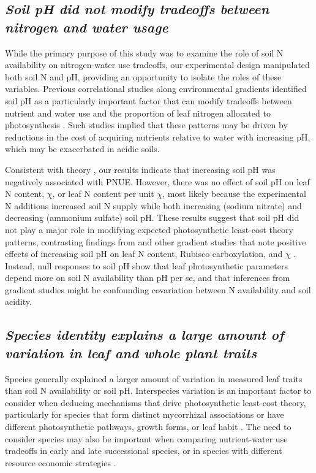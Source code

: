     \subsection{\textit{Soil pH did not modify tradeoffs between nitrogen and water usage}}
    While the primary purpose of this study was to examine the role of soil N availability on nitrogen-water use tradeoffs, our experimental design manipulated both soil N and pH, providing an opportunity to isolate the roles of these variables. Previous correlational studies along environmental gradients identified soil pH as a particularly important factor that can modify tradeoffs between nutrient and water use  and the proportion of leaf nitrogen allocated to photosynthesis . Such studies implied that these patterns may be driven by reductions in the cost of acquiring nutrients relative to water with increasing pH, which may be exacerbated in acidic soils.

    Consistent with theory , our results indicate that increasing soil pH was negatively associated with PNUE. However, there was no effect of soil pH on leaf N content, $\chi$, or leaf N content per unit $\chi$, most likely because the experimental N additions increased soil N supply while both increasing (sodium nitrate) and decreasing (ammonium sulfate) soil pH. These results suggest that soil pH did not play a major role in modifying expected photosynthetic least-cost theory patterns, contrasting findings from  and other gradient studies that note positive effects of increasing soil pH on leaf N content, Rubisco carboxylation, and $\chi$ . Instead, null responses to soil pH show that leaf photosynthetic parameters depend more on soil N availability than pH per se, and that inferences from gradient studies might be confounding covariation between N availability and soil acidity.

    \subsection{\textit{Species identity explains a large amount of variation in leaf and whole plant traits}}
    Species generally explained a larger amount of variation in measured leaf traits than soil N availability or soil pH. Interspecies variation is an important factor to consider when deducing mechanisms that drive photosynthetic least-cost theory, particularly for species that form distinct mycorrhizal associations or have different photosynthetic pathways, growth forms, or leaf habit . The need to consider species may also be important when comparing nutrient-water use tradeoffs in early and late successional species, or in species with different resource economic strategies .
    
